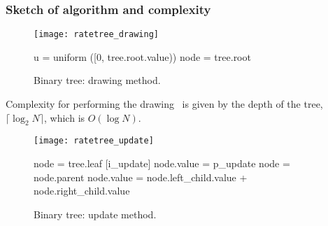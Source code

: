\subsubsection {Sketch of algorithm and complexity} 
\begin{figure}[!h]
  \begin{minipage}{0.5\textwidth}
    \texttt{[image: ratetree\_drawing]}
  \end{minipage}
  \begin{minipage}{0.5\textwidth}
    \begin{algorithm}[H]
      \SetAlgoLined
      u = uniform ([0, tree.root.value))\;
        node = tree.root\;
              {
              }
    \end{algorithm}
  \end{minipage}
  \caption{Binary tree: drawing method.}
  \label{fig:tree_drawing}
\end{figure}

Complexity for performing the drawing~ is given by the depth of the tree, $\lceil\log_2 N\rceil$, which is $O(\log N)$.

\begin{figure}[!h]
  \begin{minipage}{0.5\textwidth}
    \texttt{[image: ratetree\_update]}
  \end{minipage}
  \begin{minipage}{0.5\textwidth}
    \begin{algorithm}[H]
      \SetAlgoLined
      node = tree.leaf [i\_update]\;
      node.value = p\_update\;
            {
              node = node.parent\;
              node.value = node.left\_child.value + node.right\_child.value\;
            }
    \end{algorithm}
  \end{minipage}
  \caption{Binary tree: update method.}
  \label{fig:tree_update}
\end{figure}

